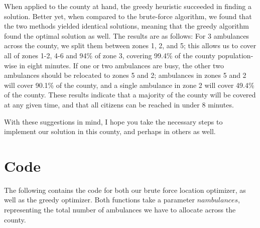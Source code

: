 \documentclass[notitlepage, 12pt]{article}
\begin{document}
When applied to the county at hand, the greedy heuristic succeeded in finding a solution. Better yet, when
compared to the brute-force algorithm, we found that the two methods yielded identical solutions, meaning that
the greedy algorithm found the optimal solution as well. The results are as follows: For 3 ambulances across
the county, we split them between zones 1, 2, and 5; this allows us to cover all of zones 1-2, 4-6 and 94\%
of zone 3, covering 99.4\% of the county population-wise in eight minutes. If one or two ambulances are busy,
the other two ambulances should be relocated to zones 5 and 2; ambulances in zones 5 and 2 will cover 90.1\%
of the county, and a single ambulance in zone 2 will cover 49.4\% of the county. These results indicate that
a majority of the county will be covered at any given time, and that all citizens can be reached in under 8 minutes.

With these suggestions in mind, I hope you take the necessary steps to implement our solution in this county,
and perhaps in others as well.

\newpage
\appendix
\section{Code}
The following contains the code for both our brute force location optimizer, as well as the greedy optimizer. Both functions take a parameter $nambulances$, representing the total number of ambulances we have to allocate across the county.




\end{document}
